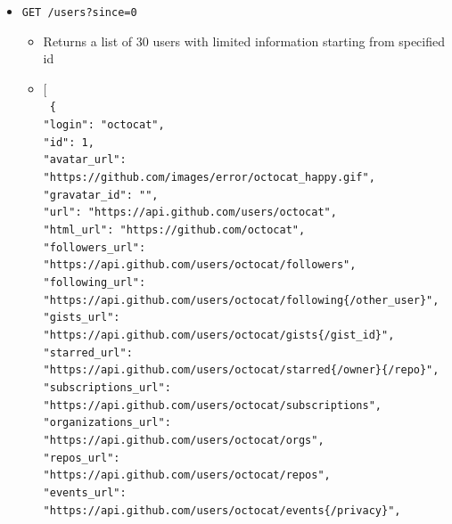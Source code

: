 \documentclass[11pt]{article}
\begin{document}
\begin{itemize}
   \item{\texttt{GET /users?since=0}}
   \begin{itemize}
	\item{Returns a list of 30 users with limited information starting from specified id}
	\item{ [\\
	\texttt{
		\{\\
		\textcolor{r}{"login"}: \textcolor{b}{"octocat"},\\
		\textcolor{r}{"id"}: \textcolor{b}{1},\\
		\textcolor{r}{"avatar\_url"}: \textcolor{b}{"https://github.com/images/error/octocat\_happy.gif"},\\
		\textcolor{r}{"gravatar\_id"}: \textcolor{b}{""},\\
		\textcolor{r}{"url"}: \textcolor{b}{"https://api.github.com/users/octocat"},\\
		\textcolor{r}{"html\_url"}: \textcolor{b}{"https://github.com/octocat"},\\
		\textcolor{r}{"followers\_url"}: \\\textcolor{b}{"https://api.github.com/users/octocat/followers"},\\
		\textcolor{r}{"following\_url"}: \\\textcolor{b}{"https://api.github.com/users/octocat/following\{/other\_user\}"},\\
		\textcolor{r}{"gists\_url"}: \\\textcolor{b}{"https://api.github.com/users/octocat/gists\{/gist\_id\}"},\\
		\textcolor{r}{"starred\_url"}: \\\textcolor{b}{"https://api.github.com/users/octocat/starred\{/owner\}\{/repo\}"},\\
		\textcolor{r}{"subscriptions\_url"}: \\\textcolor{b}{"https://api.github.com/users/octocat/subscriptions"},\\
		\textcolor{r}{"organizations\_url"}: \\\textcolor{b}{"https://api.github.com/users/octocat/orgs"},\\
		\textcolor{r}{"repos\_url"}: \\\textcolor{b}{"https://api.github.com/users/octocat/repos"},\\
		\textcolor{r}{"events\_url"}: \\\textcolor{b}{"https://api.github.com/users/octocat/events\{/privacy\}"},\\
}}
\end{itemize}
\end{itemize}
\end{document}
